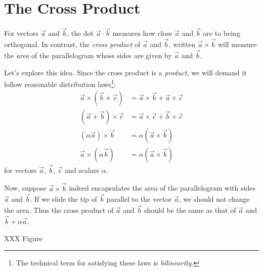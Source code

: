 \begin{exercises}
\end{exercises}

\section{The Cross Product}

For vectors $\vec a$ and $\vec b$, the dot $\vec a\cdot \vec b$ measures
how close $\vec a$ and $\vec b$ are to being orthogonal.  In contrast,
the \emph{cross product} of $\vec a$ and $\vec b$,
written $\vec a\times \vec b$ will
measure the \emph{area} of the parallelogram whose sides are given by $\vec a$ and
$\vec b$.

Let's explore this idea.  Since the cross product is a \emph{product}, we will
demand it follow reasonable distribution laws\footnote{ The technical term
for satisfying these laws is \emph{bilinearity}.}:
\begin{align*}
	\vec a\times (\vec b+\vec c) &= \vec a\times \vec b+\vec a\times\vec c\\
	(\vec a+\vec b)\times\vec c &= \vec a\times \vec c+\vec b\times \vec c\\
	(\alpha\vec a)\times \vec b &= \alpha(\vec a\times \vec b)\\
	\vec a\times(\alpha \vec b) &= \alpha(\vec a\times \vec b)
\end{align*}
for vectors $\vec a$, $\vec b$, $\vec c$ and scalars $\alpha$.

Now, suppose $\vec a\times \vec b$ indeed encapsulates the area of the parallelogram
with sides $\vec a$ and $\vec b$.  If we slide the tip of $\vec b$ parallel to the vector
$\vec a$, we should not change the area.  Thus the cross product of $\vec a$ and $\vec b$
should be the same as that of $\vec a$ and $\vec b+\alpha\vec a$.  

XXX Figure


